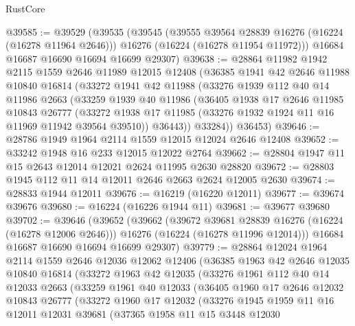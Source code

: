 \begin{lexlean}{RustCore}
\begin{coremodule}
@39585 := @39529
    (@39535
      (@39545
        (@39555 @39564 @28839 @16276 (@16224 (@16278 @11964 @2646)))
        @16276
        (@16224 (@16278 @11954 @11972)))
      @16684
      @16687
      @16690
      @16694
      @16699
      @29307)
@39638 := @28864
    @11982
    @1942
    @2115
    @1559
    @2646
    @11989
    @12015
    @12408
    (@36385
      @1941
      @42
      @2646
      @11988
      @10840
      @16814
      (@33272
        @1941
        @42
        @11988
        (@33276
          @1939
          @112
          @40
          @14
          @11986
          @2663
          (@33259
            @1939
            @40
            @11986
            (@36405
              @1938
              @17
              @2646
              @11985
              @10843
              @26777
              (@33272 @1938 @17 @11985 (@33276 @1932 @1924 @11 @16 @11969 @11942 @39564 @39510))
              @36443))
          @33284))
      @36453)
@39646 := @28786 @1949 @1964 @2114 @1559 @12015 @12024 @2646 @12408
@39652 := @33242 @1948 @16 @233 @12015 @12022 @2764
@39662 := @28804 @1947 @11 @15 @2643 @12014 @12021 @2624 @11995 @2630 @28820
@39672 := @28803 @1945 @112 @11 @14 @12011 @2646 @2663 @2624 @12005 @2630
@39674 := @28833 @1944 @12011
@39676 := @16219 (@16220 @12011)
@39677 := @39674 @39676
@39680 := @16224 (@16226 @1944 @11)
@39681 := @39677 @39680
@39702 := @39646
    (@39652
      (@39662
        (@39672 @39681 @28839 @16276 (@16224 (@16278 @12006 @2646)))
        @16276
        (@16224 (@16278 @11996 @12014)))
      @16684
      @16687
      @16690
      @16694
      @16699
      @29307)
@39779 := @28864
    @12024
    @1964
    @2114
    @1559
    @2646
    @12036
    @12062
    @12406
    (@36385
      @1963
      @42
      @2646
      @12035
      @10840
      @16814
      (@33272
        @1963
        @42
        @12035
        (@33276
          @1961
          @112
          @40
          @14
          @12033
          @2663
          (@33259
            @1961
            @40
            @12033
            (@36405
              @1960
              @17
              @2646
              @12032
              @10843
              @26777
              (@33272
                @1960
                @17
                @12032
                (@33276
                  @1945
                  @1959
                  @11
                  @16
                  @12011
                  @12031
                  @39681
                  (@37365
                    @1958
                    @11
                    @15
                    @3448
                    @12030

\end{coremodule}
\end{lexlean}
